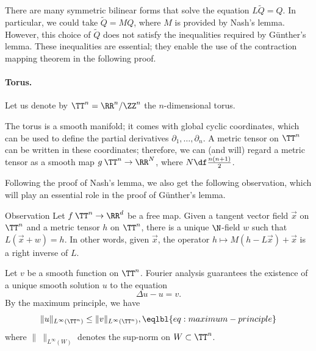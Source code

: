 There are many symmetric bilinear forms that solve the equation $L\tilde Q = Q$.
In particular, we could take $\tilde Q = MQ$, where $M$ is provided by Nash's lemma.
However, this choice of $\tilde Q$ does not satisfy the inequalities required by Günther's lemma.
These inequalities are essential; they enable the use of the contraction mapping theorem in the following proof.









\paragraph{Torus.}
Let us denote by $\TT^n=\RR^n/\ZZ^n$ the $n$-dimensional torus.

The torus is a smooth manifold;
it comes with global cyclic coordinates, which can be used to define the partial derivatives $\partial_1, \dots, \partial_n$.
A metric tensor on $\TT^n$ can be written in these coordinates;
therefore, we can (and will) regard a metric tensor as a smooth map $g\:\TT^n \to \RR^N$,
where $N \df \tfrac{n(n+1)}{2}$.\label{Nn}












Following the proof of Nash's lemma, we also get the following observation,
which will play an essential role in the proof of Günther's lemma.


\begin{thm}{Observation}\label{ex:Mv}
Let $f\:\TT^n\to\RR^d$ be a free map.
Given a tangent vector field $\vec x$ on $\TT^n$ and a metric tensor $h$ on $\TT^n$, there is a unique
$\N$-field $w$ such that $L(\vec x+w)=h$.
In other words, given $\vec x$,
the operator $h\mapsto M(h-L\vec x) + \vec x$ is a right inverse of $L$.
\end{thm}












Let $v$ be a smooth function on $\TT^n$.
Fourier analysis guarantees the existence of a unique smooth solution $u$ to the equation
\[\Delta u - u = v.\]
By the maximum principle, we have
\[\|u\|_{L^\infty(\TT^n)}\le\|v\|_{L^\infty(\TT^n)},\eqlbl{eq:maximum-principle}\]
where $\|\ \|_{L^\infty(W)}$ denotes the sup-norm on $W\subset \TT^n$.

